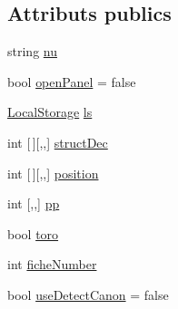 \subsection*{Attributs publics}
\begin{DoxyCompactItemize}
\item 
string \mbox{\hyperlink{class_simulation_a2766dce78dbc1f3c20353f02f57103e1}{nu}}
\item 
bool \mbox{\hyperlink{class_simulation_ab4e91933fc69c6696543f44cdc5489eb}{open\+Panel}} = false
\item 
\mbox{\hyperlink{class_local_storage}{Local\+Storage}} \mbox{\hyperlink{class_simulation_a7009e8c0768bac6a8056db7b9614a040}{ls}}
\item 
int \mbox{[}$\,$\mbox{]}\mbox{[},,\mbox{]} \mbox{\hyperlink{class_simulation_ac581af6c4b31a61b95a1c11c1d4ed38b}{struct\+Dec}}
\item 
int \mbox{[}$\,$\mbox{]}\mbox{[},,\mbox{]} \mbox{\hyperlink{class_simulation_a4a4efe47214d16664ea0c43bcc437af3}{position}}
\item 
int \mbox{[},,\mbox{]} \mbox{\hyperlink{class_simulation_a9945c13b481c81bfb75ad26e730a78d4}{pp}}
\item 
bool \mbox{\hyperlink{class_simulation_a0d34073239ee6afd6c15327ae9f249bb}{toro}}
\item 
int \mbox{\hyperlink{class_simulation_a4fd8bb7eb15c0462da5f0615d293e404}{fiche\+Number}}
\item 
bool \mbox{\hyperlink{class_simulation_a2106f84d6bf1aec6e3d852e4a4432217}{use\+Detect\+Canon}} = false
\end{DoxyCompactItemize}
